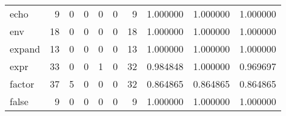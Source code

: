 \begin{longtable}{lrrrrrrrrr}
echo      &                                       9 &                                                  0 &                                                  0 &                                                  0 &                                                  0 &                                                  9 &                                           1.000000 &                               1.000000 &                             1.000000 \\
env       &                                      18 &                                                  0 &                                                  0 &                                                  0 &                                                  0 &                                                 18 &                                           1.000000 &                               1.000000 &                             1.000000 \\
expand    &                                      13 &                                                  0 &                                                  0 &                                                  0 &                                                  0 &                                                 13 &                                           1.000000 &                               1.000000 &                             1.000000 \\
expr      &                                      33 &                                                  0 &                                                  0 &                                                  1 &                                                  0 &                                                 32 &                                           0.984848 &                               1.000000 &                             0.969697 \\
factor    &                                      37 &                                                  5 &                                                  0 &                                                  0 &                                                  0 &                                                 32 &                                           0.864865 &                               0.864865 &                             0.864865 \\
false     &                                       9 &                                                  0 &                                                  0 &                                                  0 &                                                  0 &                                                  9 &                                           1.000000 &                               1.000000 &                             1.000000 \\

\end{longtable}
